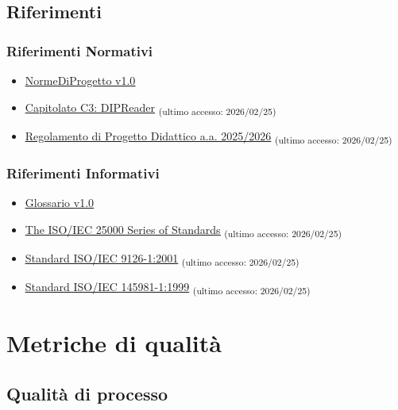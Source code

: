 \documentclass[a4paper,12pt]{article}
\newcommand{\ped}[1]{\textsubscript{#1}}
\begin{document}
\subsection{Riferimenti}

\subsubsection{Riferimenti Normativi}
\begin{itemize}
    \item \href{https://7-zpus.github.io/Docs/assets/pdf/RTB/NormeDiProgetto.pdf}{\ul{NormeDiProgetto v1.0}}
    \item \href{https://www.math.unipd.it/~tullio/IS-1/2025/Progetto/C3.pdf}{\ul{Capitolato C3: DIPReader}} \ped{(ultimo accesso: 2026/02/25)}
    \item \href{https://www.math.unipd.it/~tullio/IS-1/2025/Dispense/PD1.pdf}{\ul{Regolamento di Progetto Didattico a.a. 2025/2026}} \ped{(ultimo accesso: 2026/02/25)}
\end{itemize}
\subsubsection{Riferimenti Informativi}
\begin{itemize}
    \item \href{https://7-zpus.github.io/Docs/assets/pdf/RTB/Glossario.pdf}{\ul{Glossario v1.0}}
    \item \href{https://iso25000.com}{\ul{The ISO/IEC 25000 Series of Standards}} \ped{(ultimo accesso: 2026/02/25)}
    \item \href{https://www.iso.org/standard/63712.html}{\ul{Standard ISO/IEC 9126-1:2001}} \ped{(ultimo accesso: 2026/02/25)}
    \item \href{https://www.iso.org/standard/71952.html}{\ul{Standard ISO/IEC 145981-1:1999}} \ped{(ultimo accesso: 2026/02/25)}
\end{itemize}

\section{Metriche di qualità}

\subsection{Qualità di processo}
\end{document}
